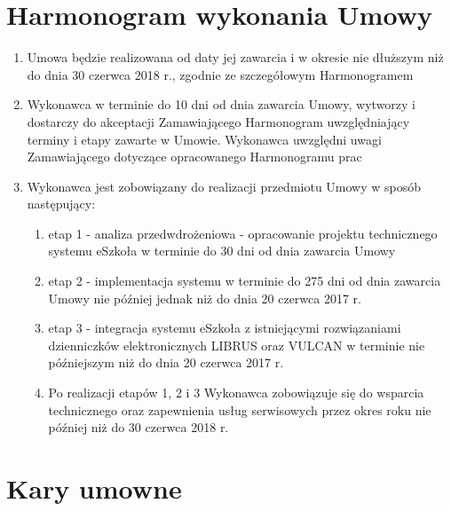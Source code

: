 \documentclass{article}
\begin{document}
\section{Harmonogram wykonania Umowy}
\begin{enumerate}
    \item Umowa będzie realizowana od daty jej zawarcia i w okresie nie dłuższym niż do dnia 30 czerwca 2018 r., zgodnie ze szczegółowym Harmonogramem
    \item Wykonawca w terminie do 10 dni od dnia zawarcia Umowy, wytworzy i dostarczy do akceptacji Zamawiającego Harmonogram uwzględniający terminy i etapy zawarte w Umowie. Wykonawca uwzględni uwagi Zamawiającego dotyczące opracowanego Harmonogramu prac
    \item Wykonawca jest zobowiązany do realizacji przedmiotu Umowy w sposób następujący:
    \begin{enumerate}
        \item etap 1 - analiza przedwdrożeniowa - opracowanie projektu technicznego systemu eSzkoła w terminie do 30 dni od dnia zawarcia Umowy
        \item etap 2 - implementacja systemu w terminie do 275 dni od dnia zawarcia      Umowy nie później jednak niż do dnia 20 czerwca 2017 r.
        \item etap 3 - integracja systemu eSzkoła z istniejącymi rozwiązaniami dzienniczków elektronicznych LIBRUS oraz VULCAN w terminie nie późniejszym niż do dnia 20 czerwca 2017 r.
        \item Po realizacji etapów 1, 2 i 3 Wykonawca zobowiązuje się do wsparcia technicznego oraz zapewnienia usług serwisowych przez okres roku nie później niż do 30 czerwca 2018 r.
    \end{enumerate}
\end{enumerate}

\section{Kary umowne}
\end{document}
